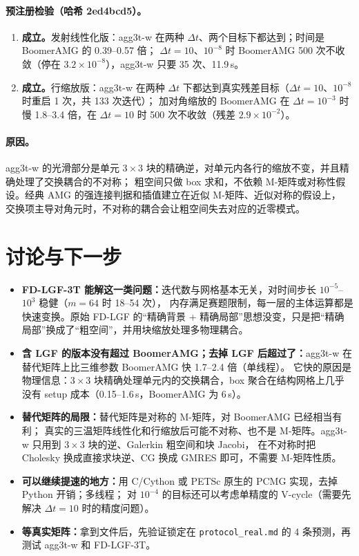 \documentclass[11pt,a4paper]{ctexart}
\begin{document}


\paragraph{预注册检验（哈希 2ed4bcd5）。}
\begin{enumerate}
\item \textbf{成立。}发射线性化版：agg3t-w 在两种 $\Delta t$、两个目标下都达到；时间是 BoomerAMG 的 0.39--0.57 倍；
$\Delta t=10$、$10^{-8}$ 时 BoomerAMG 500 次不收敛（停在 $3.2\times10^{-8}$），agg3t-w 只要 35 次、11.9\,s。
\item \textbf{成立。}行缩放版：agg3t-w 在两种 $\Delta t$ 下都达到真实残差目标（$\Delta t=10$、$10^{-8}$ 时重启 1 次，共 133 次迭代）；
加对角缩放的 BoomerAMG 在 $\Delta t=10^{-3}$ 时慢 1.8--3.4 倍，在 $\Delta t=10$ 时 500 次不收敛（残差 $2.9\times10^{-2}$）。
\end{enumerate}
\paragraph{原因。}agg3t-w 的光滑部分是单元 $3\times3$ 块的精确逆，对单元内各行的缩放不变，并且精确处理了交换耦合的不对称；
粗空间只做 box 求和，不依赖 M-矩阵或对称性假设。经典 AMG 的强连接判据和插值建立在近似 M-矩阵、近似对称的假设上，
交换项主导对角元时，不对称的耦合会让粗空间失去对应的近零模式。

\section{讨论与下一步}
\begin{itemize}
\item \textbf{FD-LGF-3T 能解这一类问题：}迭代数与网格基本无关，对时间步长 $10^{-5}$--$10^{3}$ 稳健（$m=64$ 时 18--54 次），
内存满足赛题限制，每一层的主体运算都是快速变换。原始 FD-LGF 的“精确背景 + 精确局部”思想没变，只是把“精确局部”换成了“粗空间”，并用块缩放处理多物理耦合。
\item \textbf{含 LGF 的版本没有超过 BoomerAMG；去掉 LGF 后超过了：}agg3t-w 在替代矩阵上比三维参数 BoomerAMG 快 1.7--2.4 倍（单线程）。
它快的原因是物理信息：$3\times3$ 块精确处理单元内的交换耦合，box 聚合在结构网格上几乎没有 setup 成本（0.15--1.6\,s，BoomerAMG 为 6\,s）。
\item \textbf{替代矩阵的局限：}替代矩阵是对称的 M-矩阵，对 BoomerAMG 已经相当有利；
真实的三温矩阵线性化和行缩放后可能不对称、也不是 M-矩阵。agg3t-w 只用到 $3\times3$ 块的逆、Galerkin 粗空间和块 Jacobi，
在不对称时把 Cholesky 换成直接求块逆、CG 换成 GMRES 即可，不需要 M-矩阵性质。
\item \textbf{可以继续提速的地方：}用 C/Cython 或 PETSc 原生的 PCMG 实现，去掉 Python 开销；多线程；
对 $10^{-4}$ 的目标还可以考虑单精度的 V-cycle（需要先解决 $\Delta t=10$ 时的精度问题）。
\item \textbf{等真实矩阵：}拿到文件后，先验证锁定在 \texttt{protocol\_real.md} 的 4 条预测，再测试 agg3t-w 和 FD-LGF-3T。
\end{itemize}
\end{document}
